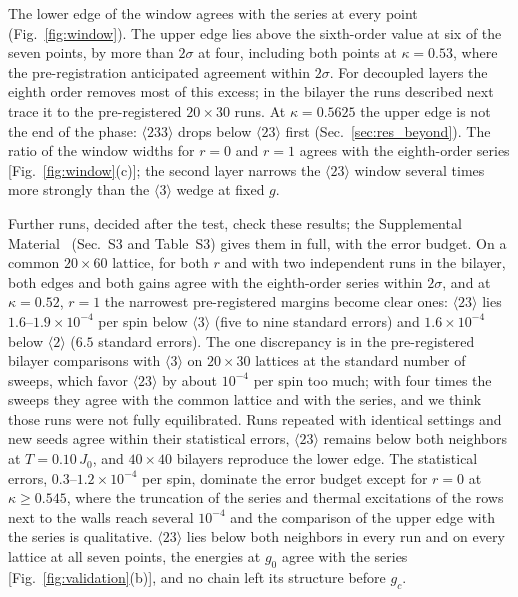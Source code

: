 \documentclass[
 aps,prb,
 twocolumn,
 superscriptaddress,
 longbibliography,
 nofootinbib,
 floatfix
]{revtex4-2}
\begin{document}
The lower edge of the window agrees with the series at every point (Fig.~\ref{fig:window}). The upper edge lies above
the sixth-order value at six of the seven points, by more than $2\sigma$ at four, including both points at
$\kappa=0.53$, where the pre-registration anticipated agreement within $2\sigma$. For decoupled layers the eighth order removes most of this excess; in the bilayer the runs described next trace it to
the pre-registered $20\times30$ runs.
At $\kappa=0.5625$ the upper edge is not the end of the
phase: $\langle233\rangle$ drops below $\langle23\rangle$ first (Sec.~\ref{sec:res_beyond}). The
ratio of the window widths for $r=0$ and $r=1$ agrees with the eighth-order series [Fig.~\ref{fig:window}(c)]; the
second layer narrows the $\langle23\rangle$ window several times more strongly than the $\langle3\rangle$ wedge at
fixed $g$.

Further runs, decided after the test, check these results; the Supplemental Material~\cite{supp} (Sec.~S3 and
Table~S3) gives them in full, with the error budget. On a common $20\times60$ lattice, for both $r$ and with two
independent runs in the bilayer, both edges and both gains agree with the eighth-order series within $2\sigma$, and at
$\kappa=0.52$, $r=1$ the narrowest pre-registered margins become clear ones: $\langle23\rangle$ lies
$1.6$--$1.9\times10^{-4}$ per spin below $\langle3\rangle$ (five to nine standard errors) and $1.6\times10^{-4}$ below
$\langle2\rangle$ ($6.5$ standard errors). The one discrepancy is in the pre-registered bilayer comparisons with
$\langle3\rangle$ on $20\times30$ lattices at the standard number of sweeps, which favor $\langle23\rangle$ by about
$10^{-4}$ per spin too much; with four times the sweeps they agree with the common lattice and with the series, and we
think those runs were not fully equilibrated. Runs repeated with identical settings and new seeds agree within their
statistical errors, $\langle23\rangle$ remains below both neighbors at $T=0.10\,J_0$, and $40\times40$ bilayers
reproduce the lower edge. The statistical errors, $0.3$--$1.2\times10^{-4}$ per spin, dominate the error budget except
for $r=0$ at $\kappa\ge0.545$, where the truncation of the series and thermal excitations of the rows next to the walls
reach several $10^{-4}$ and the comparison of the upper edge with the series is qualitative. $\langle23\rangle$ lies
below both neighbors in every run and on every lattice at all seven points, the energies at $g_0$ agree with the series
[Fig.~\ref{fig:validation}(b)], and no chain left its structure before $g_c$.
\end{document}
